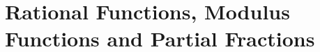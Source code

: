 \documentclass[../../main.tex]{subfiles}
\begin{document}
\chapter{Rational Functions, Modulus Functions and Partial Fractions}
\end{document}

